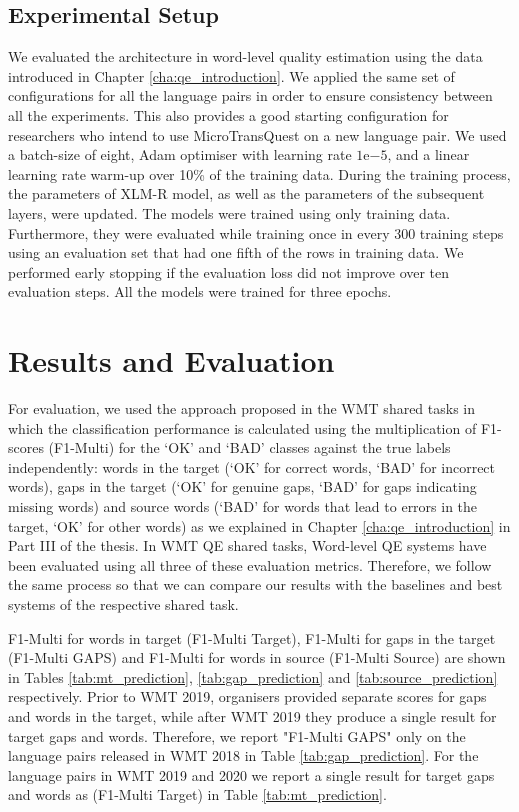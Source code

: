 \subsection{Experimental Setup}
\label{sec:word_level_experiment}
We evaluated the architecture in word-level quality estimation using the data introduced in Chapter \ref{cha:qe_introduction}. We applied the same set of configurations for all the language pairs in order to ensure consistency between all the experiments. This also provides a good starting configuration for researchers who intend to use MicroTransQuest on a new language pair. We used a batch-size of eight, Adam optimiser with learning rate $1\mathrm{e}{-5}$, and a linear learning rate warm-up over 10\% of the training data. During the training process, the parameters of XLM-R model, as well as the parameters of the subsequent layers, were updated. The models were trained using only training data. Furthermore, they were evaluated while training once in every 300 training steps using an evaluation set that had one fifth of the rows in training data. We performed early stopping if the evaluation loss did not improve over ten evaluation steps. All the models were trained for three epochs.

\section{Results and Evaluation}
\label{sec:word_level_results}
For evaluation, we used the approach proposed in the WMT shared tasks in which the classification performance is calculated using the multiplication of F1-scores (F1-Multi) for the `OK' and `BAD' classes against the true labels
independently: words in the target (`OK' for correct words, `BAD' for incorrect words), gaps in the target (`OK' for genuine gaps, `BAD' for gaps indicating missing words) and source words (`BAD' for words that lead to errors in the target, `OK' for other words) \cite{specia-etal-2018-findings} as we explained in Chapter \ref{cha:qe_introduction} in Part III of the thesis. In WMT QE shared tasks, Word-level QE systems have been evaluated using all three of these evaluation metrics. Therefore, we follow the same process so that we can compare our results with the baselines and best systems of the respective shared task.

F1-Multi for words in target (F1-Multi Target), F1-Multi for gaps in the target (F1-Multi GAPS) and F1-Multi for words in source (F1-Multi Source) are shown in Tables \ref{tab:mt_prediction}, \ref{tab:gap_prediction} and \ref{tab:source_prediction} respectively. Prior to WMT 2019, organisers provided separate scores for gaps and words in the target, while after WMT 2019 they produce a single result for target gaps and words. Therefore, we report "F1-Multi GAPS" only on the language pairs released in WMT 2018 in Table \ref{tab:gap_prediction}. For the language pairs in WMT 2019 and 2020 we report a single result for target gaps and words as (F1-Multi Target) in Table \ref{tab:mt_prediction}.

